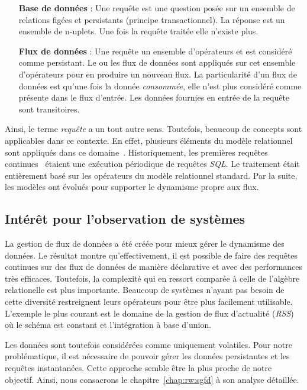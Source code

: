 \begin{itemize}
    \item[\textbf{Base de données}] : Une requête est une question posée sur un ensemble de relations figées et persistants (principe transactionnel). La réponse est un ensemble de n-uplets. Une fois la requête traitée elle n'existe plus.
    \item[\textbf{Flux de données}] : Une requête un ensemble d'opérateurs et est considéré comme persistant. Le ou les flux de données sont appliqués sur cet ensemble d'opérateurs pour en produire un nouveau flux. La particularité d'un flux de données est qu'une fois la donnée \textit{consommée}, elle n'est plus considéré comme présente dans le flux d'entrée. Les données fournies en entrée de la requête sont  transitoires.
\end{itemize}

Ainsi, le terme \textit{requête} a un tout autre sens. Toutefois, beaucoup de concepts sont applicables dans ce contexte. En effet, plusieurs éléments du modèle relationnel sont appliqués dans ce domaine~\cite{Arasu:semantic}. Historiquement, les premières requêtes continues~\cite{Terry:tapestry} étaient une exécution périodique de requêtes \textit{SQL}. Le traitement était entièrement basé sur les opérateurs du modèle relationnel standard. Par la suite, les modèles ont évolués pour supporter le dynamisme propre aux flux.

\subsection{Intérêt pour l'observation de systèmes}
La gestion de flux de données a été créée pour mieux gérer le dynamisme des données. Le résultat montre qu'effectivement, il est possible de faire des requêtes continues sur des flux de données de manière déclarative et avec des performances très efficaces. Toutefois, la complexité qui en ressort comparée à celle de l'algèbre relationelle est plus importante. Beaucoup de systèmes n'ayant pas besoin de cette diversité restreignent leurs opérateurs pour être plus facilement utilisable. L'exemple le plus courant est le domaine de la gestion de flux d'actualité (\textit{RSS}) où le schéma est constant et l'intégration à base d'union.

Les données sont toutefois considérées comme uniquement volatiles. Pour notre problématique, il est nécessaire de pouvoir gérer les données persistantes et les requêtes instantanées. Cette approche semble être la plus proche de notre objectif. Ainsi, nous consacrons le chapitre~\ref{chap:rw:sgfd} à son analyse détaillée.

